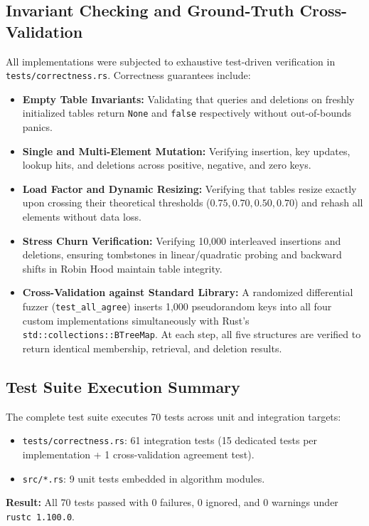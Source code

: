 \documentclass[conference]{IEEEtran}
\begin{document}
\subsection{Invariant Checking and Ground-Truth Cross-Validation}
All implementations were subjected to exhaustive test-driven verification in \texttt{tests/correctness.rs}. Correctness guarantees include:
\begin{itemize}
  \item \textbf{Empty Table Invariants:} Validating that queries and deletions on freshly initialized tables return \texttt{None} and \texttt{false} respectively without out-of-bounds panics.
  \item \textbf{Single and Multi-Element Mutation:} Verifying insertion, key updates, lookup hits, and deletions across positive, negative, and zero keys.
  \item \textbf{Load Factor and Dynamic Resizing:} Verifying that tables resize exactly upon crossing their theoretical thresholds ($0.75, 0.70, 0.50, 0.70$) and rehash all elements without data loss.
  \item \textbf{Stress Churn Verification:} Verifying 10,000 interleaved insertions and deletions, ensuring tombstones in linear/quadratic probing and backward shifts in Robin Hood maintain table integrity.
  \item \textbf{Cross-Validation against Standard Library:} A randomized differential fuzzer (\texttt{test\_all\_agree}) inserts 1,000 pseudorandom keys into all four custom implementations simultaneously with Rust's \texttt{std::collections::BTreeMap}. At each step, all five structures are verified to return identical membership, retrieval, and deletion results.
\end{itemize}

\subsection{Test Suite Execution Summary}
The complete test suite executes 70 tests across unit and integration targets:
\begin{itemize}
  \item \texttt{tests/correctness.rs}: 61 integration tests (15 dedicated tests per implementation + 1 cross-validation agreement test).
  \item \texttt{src/*.rs}: 9 unit tests embedded in algorithm modules.
\end{itemize}
\textbf{Result:} All 70 tests passed with 0 failures, 0 ignored, and 0 warnings under \texttt{rustc 1.100.0}.
\end{document}

